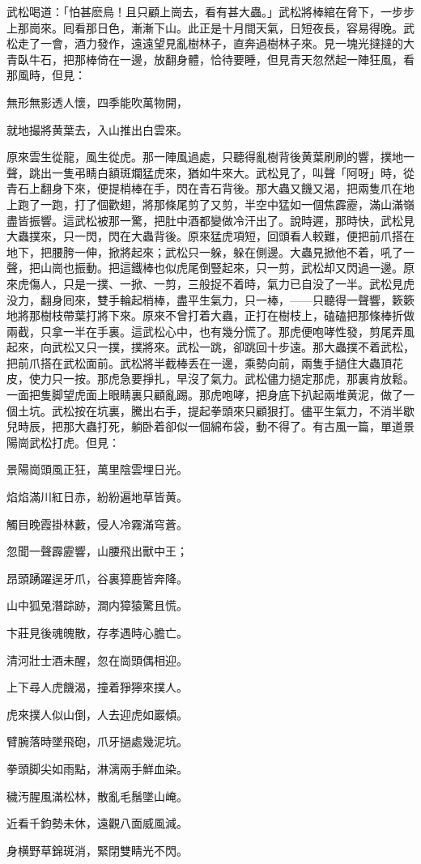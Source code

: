武松喝道：「怕甚麽鳥！且只顧上崗去，看有甚大蟲。」武松將棒綰在脅下，一步步上那崗來。囘看那日色，漸漸下山。此正是十月間天氣，日短夜長，容易得晚。武松走了一會，酒力發作，遠遠望見亂樹林子，直奔過樹林子來。見一塊光撻撻的大青臥牛石，把那棒倚在一邊，放翻身體，恰待要睡，但見青天忽然起一陣狂風，看那風時，但見：

\begin{myquote}
無形無影透人懷，四季能吹萬物開，

就地撮將黄葉去，入山推出白雲來。
\end{myquote}

原來雲生從龍，風生從虎。那一陣風過處，只聽得亂樹背後黄葉刷刷的響，撲地一聲，跳出一隻弔睛白額斑斕猛虎來，猶如牛來大。武松見了，叫聲「阿呀」時，從青石上翻身下來，便提梢棒在手，閃在青石背後。那大蟲又饑又渴，把兩隻爪在地上跑了一跑，打了個歡翅，將那條尾剪了又剪，半空中猛如一個焦霹靂，滿山滿嶺盡皆振響。這武松被那一驚，把肚中酒都變做冷汗出了。說時遲，那時快，武松見大蟲撲來，只一閃，閃在大蟲背後。原來猛虎項短，回頭看人較難，便把前爪搭在地下，把腰胯一伸，掀將起來；武松只一躲，躲在側邊。大蟲見掀他不着，吼了一聲，把山崗也振動。把這鐵棒也似虎尾倒豎起來，只一剪，武松却又閃過一邊。原來虎傷人，只是一撲、一掀、一剪，三般捉不着時，氣力已自没了一半。武松見虎没力，翻身囘來，雙手輪起梢棒，盡平生氣力，只一棒，——只聽得一聲響，簌簌地將那樹枝帶葉打將下來。原來不曾打着大蟲，正打在樹枝上，磕磕把那條棒折做兩截，只拿一半在手裏。這武松心中，也有幾分慌了。那虎便咆哮性發，剪尾弄風起來，向武松又只一撲，撲將來。武松一跳，卻跳回十步遠。那大蟲撲不着武松，把前爪搭在武松面前。武松將半截棒丢在一邊，乘勢向前，兩隻手撾住大蟲頂花皮，使力只一按。那虎急要掙扎，早沒了氣力。武松儘力撾定那虎，那裏肯放鬆。一面把隻脚望虎面上眼睛裏只顧亂踢。那虎咆哮，把身底下扒起兩堆黄泥，做了一個土坑。武松按在坑裏，騰出右手，提起拳頭來只顧狠打。儘平生氣力，不消半歇兒時辰，把那大蟲打死，躺卧着卻似一個綿布袋，動不得了。有古風一篇，單道景陽崗武松打虎。但見：

\begin{myquote}
景陽崗頭風正狂，萬里陰雲埋日光。

焰焰滿川紅日赤，紛紛遍地草皆黄。

觸目晚霞掛林藪，侵人冷霧滿穹蒼。

忽聞一聲霹靂響，山腰飛出獸中王；

昂頭踴躍逞牙爪，谷裏獐鹿皆奔降。

山中狐兔潛踪跡，澗内獐猿驚且慌。

卞莊見後魂魄散，存孝遇時心膽亡。

清河壯士酒未醒，忽在崗頭偶相迎。

上下尋人虎饑渴，撞着猙獰來撲人。

虎來撲人似山倒，人去迎虎如巖傾。

臂腕落時墜飛砲，爪牙撾處幾泥坑。

拳頭脚尖如雨點，淋漓兩手鮮血染。

穢汚腥風滿松林，散亂毛鬚墜山崦。

近看千鈞勢未休，遠觀八面威風減。

身横野草錦斑消，緊閉雙睛光不閃。
\end{myquote}
	
